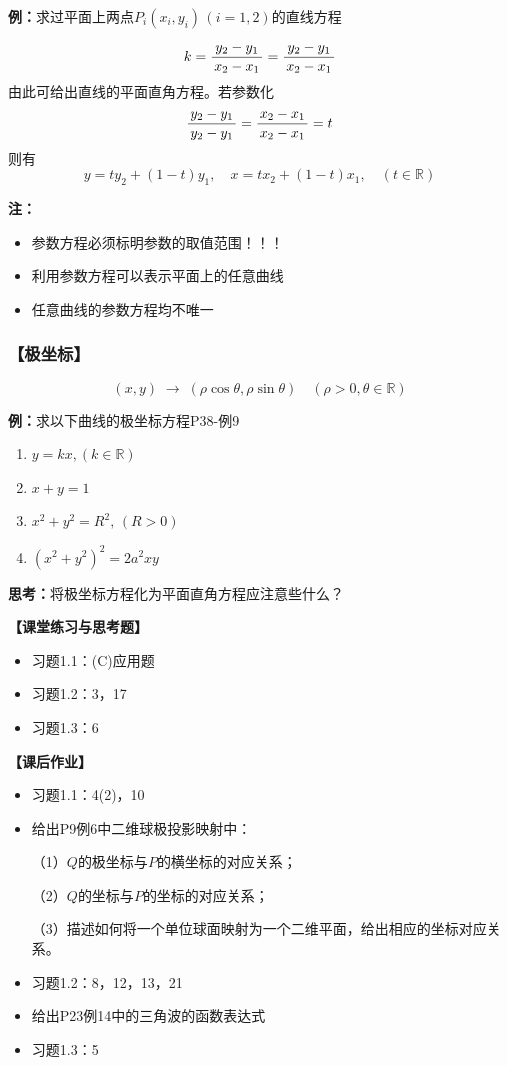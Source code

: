 {\bf 例：}求过平面上两点$P_i(x_i,y_i)\,(i=1,2)$的直线方程
		  
$$k=\displaystyle\frac{\,{y_2-y_1}\,}{\,{x_2-x_1}\,}=\displaystyle\frac{\,{y_2-y_1}\,}{\,{x_2-x_1}\,}$$
由此可给出直线的平面直角方程。若参数化
$$\displaystyle\frac{\,{y_2-y_1}\,}{\,{y_2-y_1}\,}=\displaystyle\frac{\,{x_2-x_1}\,}{\,{x_2-x_1}\,}=t$$
则有
$$y=ty_2+(1-t)y_1,\quad x=tx_2+(1-t)x_1,\quad (t\in\mathbb{R})$$
		  
{\bf 注：}
\begin{itemize}
  \item 参数方程必须标明参数的取值范围！！！
  \item {利用参数方程可以表示平面上的任意曲线}
  \item {任意曲线的参数方程均不唯一}
\end{itemize}

\subsubsection{【极坐标】}

$$(x,y)\;\to\;(\rho\cos\theta,\rho\sin\theta)\quad
(\rho>0,\theta\in\mathbb{R})$$
	
{{\bf 例：}求以下曲线的极坐标方程\hfill P38-例9}
		
\begin{enumerate}
  \item $y=kx,(k\in\mathbb{R})$
  \item $x+y=1$
  \item $x^2+y^2=R^2,\,(R>0)$
  \item $(x^2+y^2)^2=2a^2xy$
\end{enumerate}
	
{\bf 思考：}将极坐标方程化为平面直角方程应注意些什么？

\vspace{4em}

{\bf 【课堂练习与思考题】}

\begin{itemize}
  \item 习题1.1：(C)应用题
  \item 习题1.2：3，17
  \item 习题1.3：6
\end{itemize}

{\bf 【课后作业】}
	
\begin{itemize}
  \item 习题1.1：4(2)，10
  \item 给出P9例6中二维球极投影映射中：
  
  （1）$Q$的极坐标与$P$的横坐标的对应关系；
  
  （2）$Q$的坐标与$P$的坐标的对应关系；
  
  （3）描述如何将一个单位球面映射为一个二维平面，给出相应的坐标对应关系。
  \item 习题1.2：8，12，13，21
  \item 给出P23例14中的三角波的函数表达式
  \item 习题1.3：5
\end{itemize}